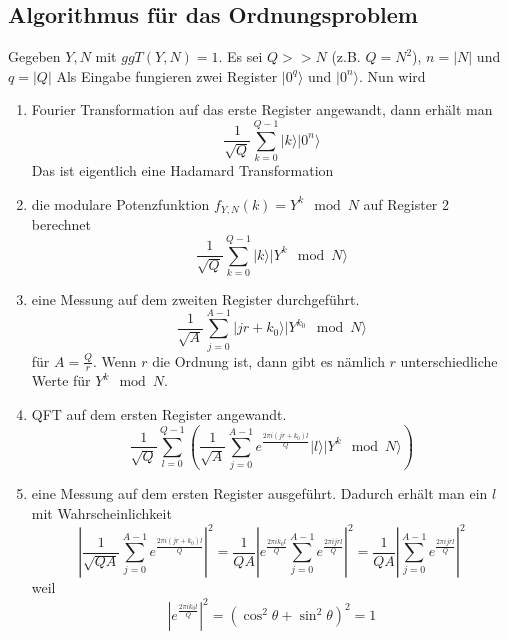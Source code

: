\documentclass[a4paper, 12pt]{article}
\theoremstyle{plain}
\theoremstyle{definition}
\theoremstyle{lemma}
\theoremstyle{remark}
\theoremstyle{example}
\begin{document}
	\subsection{Algorithmus für das Ordnungsproblem}
	Gegeben $Y,N$ mit $ggT(Y,N) = 1$. Es sei $Q>>N$ (z.B. $Q = N^2$), $n = \left|N\right|$ und $q = \left|Q\right|$ Als Eingabe fungieren zwei Register $|0^q\rangle$ und $|0^n\rangle$. Nun wird \begin{enumerate}
		\item Fourier Transformation auf das erste Register angewandt, dann erhält man \[\frac{1}{\sqrt{Q}}\sum_{k=0}^{Q-1}|k\rangle |0^n\rangle\] Das ist eigentlich eine Hadamard Transformation
		\item die modulare Potenzfunktion $f_{Y,N}(k) = Y^k \mod N$ auf Register 2 berechnet \[\frac{1}{\sqrt{Q}} \sum_{k=0}^{Q-1} |k\rangle |Y^k \mod N\rangle\]
		\item eine Messung auf dem zweiten Register durchgeführt. \[\frac{1}{\sqrt{A}}\sum_{j=0}^{A-1}|jr+k_0\rangle |Y^{k_0} \mod N\rangle \] für $A=\frac{Q}{r}$. Wenn $r$ die Ordnung ist, dann gibt es nämlich $r$ unterschiedliche Werte für $Y^k\mod N$.
		\item QFT auf dem ersten Register angewandt. \[\frac{1}{\sqrt{Q}}\sum_{l=0}^{Q-1} \left(\frac{1}{\sqrt{A}} \sum_{j=0}^{A-1} e^{\frac{2\pi i(jr+k_0)l}{Q}}|l\rangle |Y^k \mod N\rangle\right)\]
		\item eine Messung auf dem ersten Register ausgeführt. Dadurch erhält man ein $l$ mit Wahrscheinlichkeit \[\left|\frac{1}{\sqrt{QA}}\sum_{j=0}^{A-1} e^{\frac{2\pi i(jr+k_0)l}{Q}}\right|^2 = \frac{1}{QA}\left|e^{\frac{2\pi i k_0 l}{Q}} \sum_{j=0}^{A-1} e^\frac{2\pi i j r l}{Q}\right|^2 = \frac{1}{QA}\left|\sum_{j=0}^{A-1} e^\frac{2\pi i j r l}{Q}\right|^2\] weil $$\left|e^{\frac{2\pi i k_0 l}{Q}}\right|^2 = \left(\cos^2\theta + \sin^2 \theta\right)^2 = 1$$
	\end{enumerate}
\end{document}
